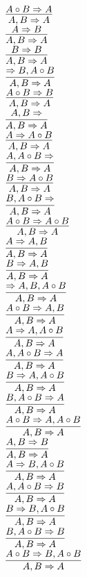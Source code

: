 \documentclass[11pt]{article}
\begin{document}
\begin{center}
\bigskip
\\$\infer{A, B\Rightarrow A}{A\circ B\Rightarrow A}$
\bigskip
\\$\infer{A, B\Rightarrow A}{A\Rightarrow B}$
\bigskip
\\$\infer{A, B\Rightarrow A}{B\Rightarrow B}$
\bigskip
\\$\infer{A, B\Rightarrow A}{\Rightarrow B, A\circ B}$
\bigskip
\\$\infer{A, B\Rightarrow A}{A\circ B\Rightarrow B}$
\bigskip
\\$\infer{A, B\Rightarrow A}{A, B\Rightarrow }$
\bigskip
\\$\infer{A, B\Rightarrow A}{A\Rightarrow A\circ B}$
\bigskip
\\$\infer{A, B\Rightarrow A}{A, A\circ B\Rightarrow }$
\bigskip
\\$\infer{A, B\Rightarrow A}{B\Rightarrow A\circ B}$
\bigskip
\\$\infer{A, B\Rightarrow A}{B, A\circ B\Rightarrow }$
\bigskip
\\$\infer{A, B\Rightarrow A}{A\circ B\Rightarrow A\circ B}$
\bigskip
\\$\infer{A, B\Rightarrow A}{A\Rightarrow A, B}$
\bigskip
\\$\infer{A, B\Rightarrow A}{B\Rightarrow A, B}$
\bigskip
\\$\infer{A, B\Rightarrow A}{\Rightarrow A, B, A\circ B}$
\bigskip
\\$\infer{A, B\Rightarrow A}{A\circ B\Rightarrow A, B}$
\bigskip
\\$\infer{A, B\Rightarrow A}{A\Rightarrow A, A\circ B}$
\bigskip
\\$\infer{A, B\Rightarrow A}{A, A\circ B\Rightarrow A}$
\bigskip
\\$\infer{A, B\Rightarrow A}{B\Rightarrow A, A\circ B}$
\bigskip
\\$\infer{A, B\Rightarrow A}{B, A\circ B\Rightarrow A}$
\bigskip
\\$\infer{A, B\Rightarrow A}{A\circ B\Rightarrow A, A\circ B}$
\bigskip
\\$\infer{A, B\Rightarrow A}{A, B\Rightarrow B}$
\bigskip
\\$\infer{A, B\Rightarrow A}{A\Rightarrow B, A\circ B}$
\bigskip
\\$\infer{A, B\Rightarrow A}{A, A\circ B\Rightarrow B}$
\bigskip
\\$\infer{A, B\Rightarrow A}{B\Rightarrow B, A\circ B}$
\bigskip
\\$\infer{A, B\Rightarrow A}{B, A\circ B\Rightarrow B}$
\bigskip
\\$\infer{A, B\Rightarrow A}{A\circ B\Rightarrow B, A\circ B}$

\end{center}
\end{document}
